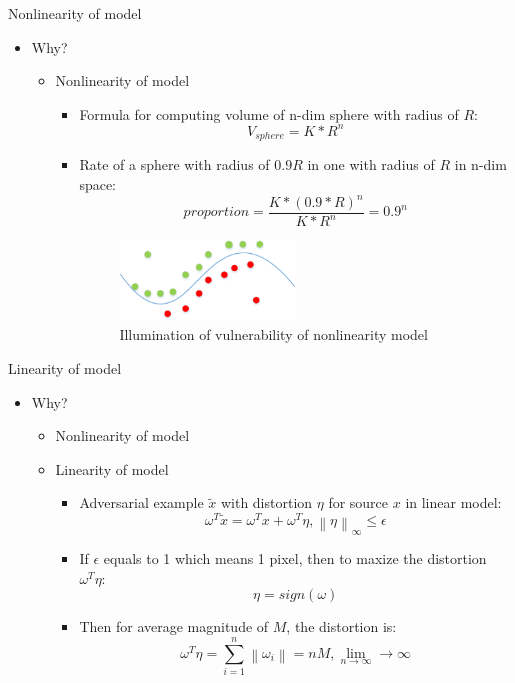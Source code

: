 \documentclass[
 size=12pt,
 paper=smartboard, %
 mode=present, %
 display=slides, %
style=tuliplab,
pauseslide,
fleqn,leqno]{powerdot}
\begin{document}
\begin{slide}{Nonlinearity of model}
  \begin{itemize}
    \item Why? \pause
    \begin{itemize}
      \item Nonlinearity of model \cite{RN143} \pause
      \begin{itemize}
        \item Formula for computing volume of n-dim sphere with radius of $R$: \pause
        $$
        V_{sphere} = K * R ^ n
        $$ \pause
        \item Rate of a sphere with radius of $0.9R$ in one with radius of $R$ in n-dim space: \pause
        $$
        proportion = \frac{K*(0.9*R)^n}{K*R^n} = 0.9^n
        $$
        \pause
        \begin{figure}[h]
          \centering
          \includegraphics[width=0.5\textwidth]{figures3/density.eps}
          \caption{Illumination of vulnerability of nonlinearity model}
          \label{fig:illumination-of-nonlinearity}
        \end{figure}
      \end{itemize} 
    \end{itemize}
  \end{itemize}
\end{slide}

\begin{slide}{Linearity of model}
  \begin{itemize}
    \item Why?
    \begin{itemize}
      \item Nonlinearity of model \cite{RN143}
      \item Linearity of model \cite{RN48} \pause
      \begin{itemize}
        \item Adversarial example $\tilde{x}$ with distortion $\eta$ for source $x$ in linear model: \pause
        $$
        \omega^T \tilde{x} = \omega^T x + \omega^T \eta, 
        \left\|\eta\right\|_\infty \le \epsilon
        $$ \pause
        \item If $\epsilon $ equals to 1 which means 1 pixel, then to maxize the distortion $\omega^T\eta$: \pause
        $$
        \eta = sign(\omega)
        $$ \pause
        \item Then for average magnitude of $M$, the distortion is: \pause
        $$
        \omega^T\eta = \sum_{i=1}^{n}{\left\|\omega_i\right\|} = nM, \lim_{n\to\infty} \to \infty
        $$
      \end{itemize}
    \end{itemize}
  \end{itemize}
\end{slide}
\end{document}
